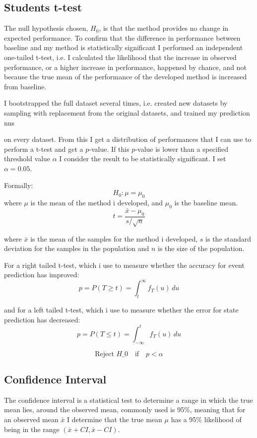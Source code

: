 \documentclass[UKenglish]{uiomasterthesis}
\begin{document}
\subsection{Students t-test}
The null hypothesis chosen, $H_0$, is that the method provides no change in expected performance. To confirm that the difference in performance between baseline and my method is statistically significant I performed an independent one-tailed t-test, i.e. I calculated the likelihood that the increase in observed performance, or a higher increase in performance, happened by chance, and not because the true mean of the performance of the developed method is increased from baseline.

I bootstrapped the full dataset several times, i.e. created new datasets by sampling with replacement from the original datasets, and trained my prediction \acp{nn} 

on every dataset. From this I get a distribution of performances that I can use to perform a t-test and get a $p$-value. If this $p$-value is lower than a specified threshold value $\alpha$ I consider the result to be statistically significant. I set $\alpha = 0.05$.

Formally: 
$$
H_0: \mu = \mu_0
$$
where $\mu$ is the mean of the method i developed, and $\mu_0$ is the baseline mean.
$$
t = \frac{\bar{x} - \mu_0}{s/\sqrt{n}}
$$

where $\bar{x}$ is the mean of the samples for the method i developed, $s$ is the standard deviation for the samples in the population and $n$ is the size of the population.

For a right tailed t-test, which i use to measure whether the accuracy for event prediction has improved:
$$p = P(T \geq t) = \int_{t}^{\infty} f_T(u)\,du$$

and for a left tailed t-test, which i use to measure whether the error for state prediction has decreased:
$$p = P(T \leq t) = \int_{-\infty}^{t} f_T(u)\,du$$

$$\text{Reject } H\_0 \quad \text{if} \quad p < \alpha$$

\subsection{Confidence Interval}
The confidence interval is a statistical test to determine a range in which the true mean lies, around the observed mean, commonly used is 95\%, meaning that for an observed mean $\bar{x}$ I determine that the true mean $\mu$ has a 95\% likelihood of being in the range $(\bar{x}+ CI, \bar{x} - CI)$\cite{ci}.
\end{document}
